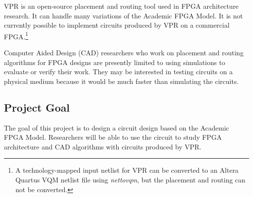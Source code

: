VPR\cite{vpr} is an open-source placement and routing tool used in FPGA architecture research.
It can handle many variations of the Academic FPGA Model.
It is not currently possible to implement circuits produced by VPR on a commercial FPGA.\footnote{A technology-mapped input netlist for VPR can be converted to an Altera Quartus VQM netlist file using \emph{nettovqm}\cite{nettovqm}, but the placement and routing can not be converted.}

Computer Aided Design (CAD) researchers who work on placement and routing algorithms for FPGA designs are presently limited to using simulations to evaluate or verify their work.
They may be interested in testing circuits on a physical medium because it would be much faster than simulating the circuits.



\subsection{Project Goal}

% 

The goal of this project is to design a circuit design based on the Academic FPGA Model.
Researchers will be able to use the circuit to study FPGA architecture and CAD algorithms with circuits produced by VPR.



